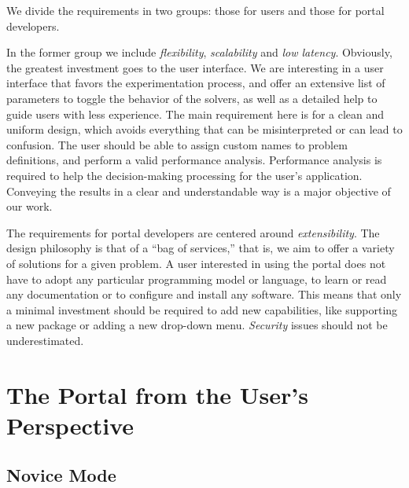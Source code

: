 \documentclass[11pt,relax]{SANDreport}
\begin{document}
We divide the requirements in two groups: those for users and those for
portal developers. 

In the former group we include {\sl flexibility}, {\sl scalability} and {\sl
  low latency}. Obviously, the greatest investment goes to the user interface.
We are interesting in a user interface that favors the
experimentation process, and offer an extensive list of parameters to toggle
the behavior of the solvers, as well as a detailed help to guide users with
less experience. The main requirement here is for a clean and uniform design,
which avoids
everything that can be misinterpreted or can lead to confusion. The user
should be able to assign custom names to problem definitions, and perform 
a valid performance analysis. Performance analysis is required to help the 
decision-making processing for the user's application.  Conveying the
results in a clear and understandable way is a major objective of our work.

The requirements for portal developers are centered around 
{\sl extensibility}.  
The design philosophy is that of a ``bag of services,'' that is, we aim to
offer a variety of solutions for a given problem. A user interested in using
the portal does not have to adopt any particular programming model or
language, to learn or read any documentation or to configure and install any
software. This means that 
only a minimal investment should be required to add new
capabilities, like supporting a new package or adding a new drop-down menu.
{\sl Security} issues should not be underestimated. 

\section{The Portal from the User's Perspective}
\label{sec:navigation}

\subsection{Novice Mode}
\end{document}
